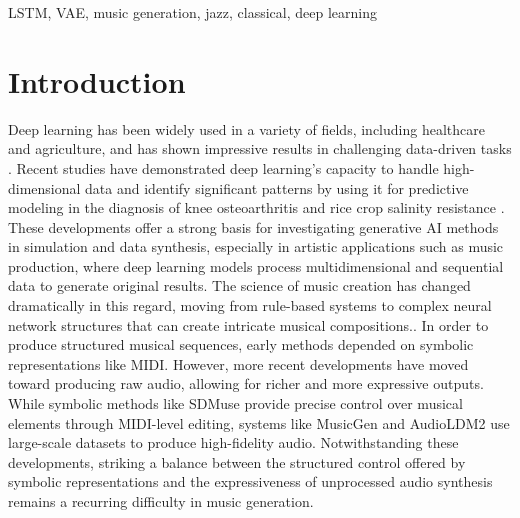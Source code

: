 \documentclass[conference]{IEEEtran}
\begin{document}
\begin{IEEEkeywords}
LSTM, VAE, music generation, jazz, classical, deep learning
\end{IEEEkeywords}

\section{Introduction}
Deep learning has been widely used in a variety of fields, including healthcare and agriculture, and has shown impressive results in challenging data-driven tasks \cite{fc1, fc2, fc3, fc4}.  Recent studies have demonstrated deep learning's capacity to handle high-dimensional data and identify significant patterns by using it for predictive modeling in the diagnosis of knee osteoarthritis and rice crop salinity resistance \cite{fc1, fc2, fc3, fc4}.  These developments offer a strong basis for investigating generative AI methods in simulation and data synthesis, especially in artistic applications such as music production, where deep learning models process multidimensional and sequential data to generate original results.  The science of music creation has changed dramatically in this regard, moving from rule-based systems to complex neural network structures that can create intricate musical compositions.\cite{mariani2024multisourcediffusionmodelssimultaneous, huang2024symbolicmusicgenerationnondifferentiable}.  In order to produce structured musical sequences, early methods depended on symbolic representations like MIDI. However, more recent developments have moved toward producing raw audio, allowing for richer and more expressive outputs.  While symbolic methods like SDMuse \cite{zhang2022sdmusestochasticdifferentialmusic} provide precise control over musical elements through MIDI-level editing, systems like MusicGen \cite{copet2024simplecontrollablemusicgeneration} and AudioLDM2 \cite{liu2024audioldm2learningholistic} use large-scale datasets to produce high-fidelity audio.  Notwithstanding these developments, striking a balance between the structured control offered by symbolic representations and the expressiveness of unprocessed audio synthesis remains a recurring difficulty in music generation.
\end{document}
